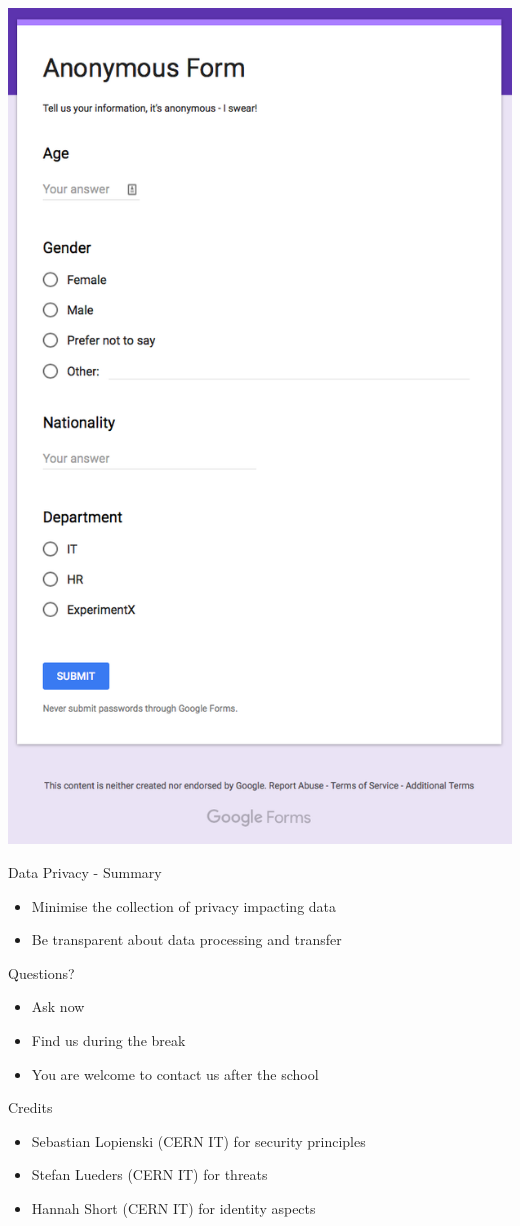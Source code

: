 \documentclass{beamer}
\begin{document}
\begin{frame}{}
\begin{center}
\includegraphics[width=0.45\linewidth]{anonymous-form.png}
\end{center}
\end{frame}

\begin{frame}{Data Privacy - Summary}
\begin{itemize}
\item Minimise the collection of privacy impacting data 
\item Be transparent about data processing and transfer
\end{itemize}
\end{frame}

\begin{frame}{Questions?}
\begin{itemize}
\item Ask now
\item Find us during the break
\item You are welcome to contact us after the school
\end{itemize}
\end{frame}

\begin{frame}{Credits}
	\begin{itemize}
		\item Sebastian Lopienski (CERN IT) for security principles
		\item Stefan Lueders (CERN IT) for threats
        \item Hannah Short (CERN IT) for identity aspects 
	\end{itemize}
\end{frame}

\backcover
\end{document}
